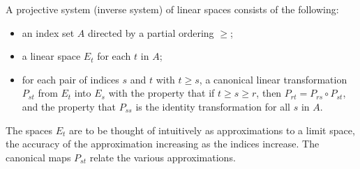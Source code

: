 A projective system (inverse system) of linear spaces consists of the following:
\begin{itemize}
\item an index set $A$ directed by a partial ordering $\geq$;
\item a linear space $E_t$ for each $t$ in $A$;
\item for each pair of indices $s$ and $t$ with $t \geq s$, a canonical linear transformation $P_{st}$ from $E_t$ into $E_s$ with the property that if $t \geq s \geq r$, then $P_{rt} = P_{rs} \circ P_{st}$, and the property that $P_{ss}$ is the identity transformation for all $s$ in $A$.
\end{itemize}
The spaces $E_t$ are to be thought of intuitively as approximations to a limit space, the accuracy of the approximation increasing as the indices increase. The canonical maps $P_{st}$ relate the various approximations.
